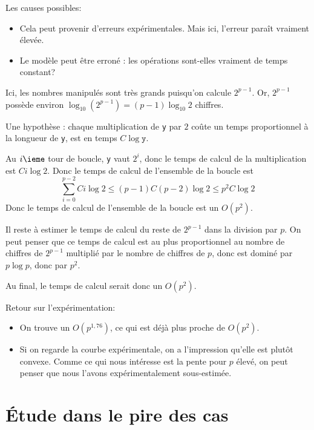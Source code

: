 Les causes possibles:
\begin{itemize}
\item[\textbullet] Cela peut provenir d'erreurs expérimentales. Mais ici, l'erreur paraît vraiment 
élevée.
\item[\textbullet] Le modèle peut être erroné : les opérations sont-elles vraiment de temps constant?
\end{itemize}

Ici, les nombres manipulés sont très grands puisqu'on calcule
$2^{p-1}$. Or, $2^{p-1}$ possède environ $\log_{10} (2^{p-1}) =
(p-1)\log_{10} 2$ chiffres.

Une hypothèse : chaque multiplication de \texttt{y} par $2$ coûte un temps proportionnel à la longueur de \texttt{y}, est en temps $C \log \texttt{y}$.

Au $i\ieme$ tour de boucle, \texttt{y} vaut $2^{i}$, donc le temps de
calcul de la multiplication est $C i \log 2$. Donc le temps de calcul
de l'ensemble de la boucle est
\begin{equation*}
  \sum_{i=0}^{p-2} C i \log 2 \leq (p-1) C (p-2)\log 2\leq p^{2}C\log 2
\end{equation*}
Donc le temps de calcul de l'ensemble de la boucle est un $O(p^{2})$.

Il reste à estimer le temps de calcul du reste de $2^{p-1}$ dans la
division par $p$. On peut penser que ce temps de calcul est au plus
proportionnel au nombre de chiffres de $2^{p-1}$ multiplié par le
nombre de chiffres de $p$, donc est dominé par $p\log p$, donc par
$p^{2}$.

Au final, le temps de calcul serait donc un $O(p^{2})$.

Retour sur l'expérimentation:
\begin{itemize}
\item[\textbullet] On trouve un $O(p^{1,76})$, ce qui est déjà plus proche de $O(p^{2})$.
\item[\textbullet] Si on regarde la courbe expérimentale, on a l'impression qu'elle
  est plutôt convexe. Comme ce qui nous intéresse est la pente pour
  $p$ élevé, on peut penser que nous l'avons expérimentalement sous-estimée.
\end{itemize}

\section{\'Etude dans le pire des cas}

